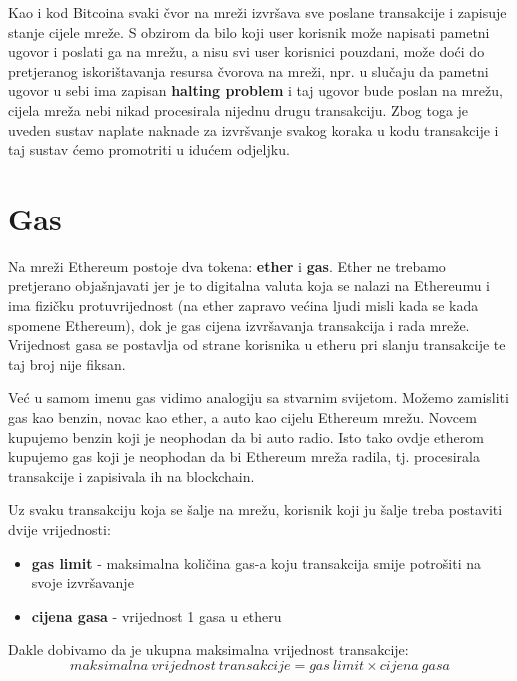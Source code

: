 \documentclass[a4paper,oneside,12pt]{memoir} %
\begin{document}
Kao i kod Bitcoina svaki čvor na mreži izvršava sve poslane transakcije i zapisuje stanje cijele mreže. S obzirom da bilo koji user korisnik može napisati pametni ugovor i poslati ga na mrežu, a nisu svi user korisnici pouzdani, može doći do pretjeranog iskorištavanja resursa čvorova na mreži, npr. u slučaju da pametni ugovor u sebi ima zapisan \textbf{halting problem} i taj ugovor bude poslan na mrežu, cijela mreža nebi nikad procesirala nijednu drugu transakciju. Zbog toga je uveden sustav naplate naknade za izvršvanje svakog koraka u kodu transakcije i taj sustav ćemo promotriti u idućem odjeljku.

\section{Gas}

Na mreži Ethereum postoje dva tokena: \textbf{ether} i \textbf{gas}. Ether ne trebamo pretjerano objašnjavati jer je to digitalna valuta koja se nalazi na Ethereumu i ima fizičku protuvrijednost (na ether zapravo većina ljudi misli kada se kada spomene Ethereum), dok je gas cijena izvršavanja transakcija i rada mreže. Vrijednost gasa se postavlja od strane korisnika u etheru pri slanju transakcije te taj broj nije fiksan.

\begin{tcolorbox}
Već u samom imenu gas vidimo analogiju sa stvarnim svijetom. Možemo zamisliti gas kao benzin, novac kao ether, a auto kao cijelu Ethereum mrežu. Novcem kupujemo benzin koji je neophodan da bi auto radio. Isto tako ovdje etherom kupujemo gas koji je neophodan da bi Ethereum mreža radila, tj. procesirala transakcije i zapisivala ih na blockchain.
\end{tcolorbox}

Uz svaku transakciju koja se šalje na mrežu, korisnik koji ju šalje treba postaviti dvije vrijednosti:

\begin{itemize}
    \item \textbf{gas limit} - maksimalna količina gas-a koju transakcija smije potrošiti na svoje izvršavanje
    \item \textbf{cijena gasa} - vrijednost 1 gasa u etheru
\end{itemize}

Dakle dobivamo da je ukupna maksimalna vrijednost transakcije:
\begin{equation*}
    maksimalna\ vrijednost\ transakcije = gas\ limit \times cijena\ gasa
\end{equation*}
\end{document}
